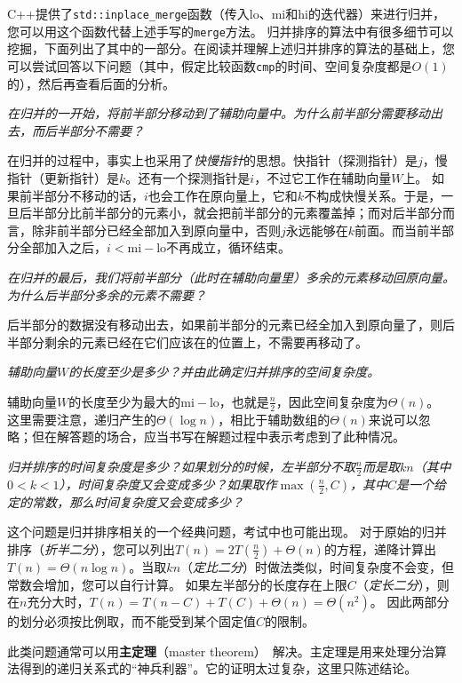 C++提供了\lstinline{std::inplace_merge}函数（传入lo、mi和hi的迭代器）来进行归并，您可以用这个函数代替上述手写的\lstinline{merge}方法。
归并排序的算法中有很多细节可以挖掘，下面列出了其中的一部分。在阅读并理解上述归并排序的算法的基础上，您可以尝试回答以下问题（其中，假定比较函数\lstinline{cmp}的时间、空间复杂度都是$O(1)$的），然后再查看后面的分析。

\textit{在归并的一开始，将前半部分移动到了辅助向量中。为什么前半部分需要移动出去，而后半部分不需要？}

在归并的过程中，事实上也采用了\textit{快慢指针}的思想。快指针（探测指针）是$j$，慢指针（更新指针）是$k$。还有一个探测指针是$i$，不过它工作在辅助向量$W$上。
如果前半部分不移动的话，$i$也会工作在原向量上，它和$k$不构成快慢关系。于是，一旦后半部分比前半部分的元素小，就会把前半部分的元素覆盖掉；而对后半部分而言，除非前半部分已经全部加入到原向量中，否则$j$永远能够在$k$前面。而当前半部分全部加入之后，$i<\mathrm{mi}-\mathrm{lo}$不再成立，循环结束。

\textit{在归并的最后，我们将前半部分（此时在辅助向量里）多余的元素移动回原向量。为什么后半部分多余的元素不需要？}

后半部分的数据没有移动出去，如果前半部分的元素已经全加入到原向量了，则后半部分剩余的元素已经在它们应该在的位置上，不需要再移动了。

\textit{辅助向量$W$的长度至少是多少？并由此确定归并排序的空间复杂度。}

辅助向量$W$的长度至少为最大的$\mathrm{mi}-\mathrm{lo}$，也就是$\frac{n}2$，因此空间复杂度为$\Theta(n)$。
这里需要注意，递归产生的$\Theta(\log n)$，相比于辅助数组的$\Theta(n)$来说可以忽略；但在解答题的场合，应当书写在解题过程中表示考虑到了此种情况。

\textit{归并排序的时间复杂度是多少？如果划分的时候，左半部分不取$\frac{n}2$而是取$kn$（其中$0<k<1$），时间复杂度又会变成多少？如果取作$\max\left(\frac{n}2, C\right)$，其中$C$是一个给定的常数，那么时间复杂度又会变成多少？}

这个问题是归并排序相关的一个经典问题，考试中也可能出现。
对于原始的归并排序（\textit{折半二分}），您可以列出$T(n)=2T\left(\frac n2\right)+\Theta(n)$的方程，递降计算出$T(n)=\Theta(n\log n)$。当取$kn$（\textit{定比二分}）时做法类似，时间复杂度不会变，但常数会增加，您可以自行计算。
如果左半部分的长度存在上限$C$（\textit{定长二分}），则在$n$充分大时，$T(n)=T(n-C)+T(C)+\Theta(n)=\Theta(n^2)$。
因此两部分的划分必须按比例取，而不能受到某个固定值$C$的限制。

此类问题通常可以用\textbf{主定理}（master theorem）~\cite{bentley1980general}解决。主定理是用来处理分治算法得到的递归关系式的“神兵利器”。它的证明太过复杂，这里只陈述结论。


